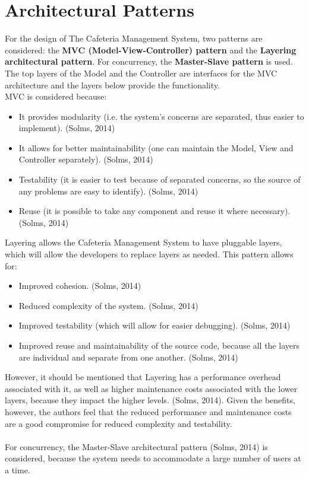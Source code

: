 \documentclass[a4paper,12pt]{article}
\begin{document}
\section{Architectural Patterns}
		For the design of The Cafeteria Management System, two patterns are considered: the \textbf{MVC (Model-View-Controller) pattern} and the \textbf{Layering architectural pattern}. For concurrency, the \textbf{Master-Slave pattern} is used.\\
		The top layers of the Model and the Controller are interfaces for the MVC architecture and the layers below provide the functionality.\\
		MVC is considered because:
		\begin{itemize}
			\item It provides modularity (i.e. the system's concerns are separated, thus easier to implement). (Solms, 2014)
			\item It allows for better maintainability (one can maintain the Model, View and Controller separately). (Solms, 2014)
			\item Testability (it is easier to test because of separated concerns, so the source of any problems are easy to identify). (Solms, 2014)
			\item Reuse (it is possible to take any component and reuse it where necessary). (Solms, 2014)
		\end{itemize} 
		Layering allows the Cafeteria Management System to have pluggable layers, which will allow the developers to replace layers as needed.
		This pattern allows for: 
		\begin{itemize}
			\item Improved cohesion. (Solms, 2014)
			\item Reduced complexity of the system. (Solms, 2014)
			\item Improved testability (which will allow for easier debugging). (Solms, 2014)
			\item Improved reuse and maintainability of the source code, because all the layers are individual and separate from one another. (Solms, 2014)
		\end{itemize}
		However, it should be mentioned that Layering has a performance overhead associated with it, as well as higher maintenance costs associated with the lower layers, because they impact the higher levels. (Solms, 2014). Given the benefits, however, the authors feel that the reduced performance and maintenance costs are a good compromise for reduced complexity and testability.\\
		\\
		For concurrency, the Master-Slave architectural pattern (Solms, 2014) is considered, because the system needs to accommodate a large number of users at a time.
\end{document}
